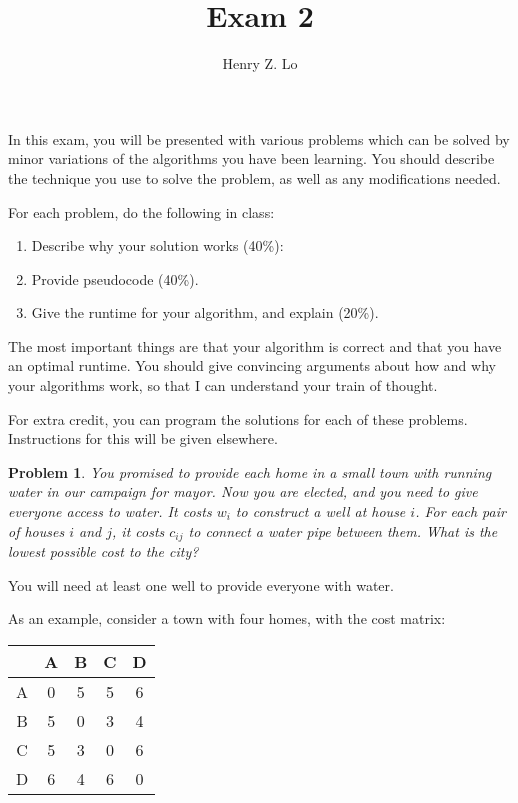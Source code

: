 \documentclass{article}
\newtheorem{problem}{Problem}
\begin{document}
\title{Exam 2}
\author{Henry Z. Lo}
\maketitle

In this exam, you will be presented with various problems which can be solved by minor variations of the algorithms you have been learning.  You should describe the technique you use to solve the problem, as well as any modifications needed.  

For each problem, do the following in class:

\begin{enumerate}
\item Describe why your solution works (40\%):
\item Provide pseudocode (40\%).
\item Give the runtime for your algorithm, and explain (20\%).
\end{enumerate}

The most important things are that your algorithm is correct and that you have an optimal runtime.  You should give convincing arguments about how and why your algorithms work, so that I can understand your train of thought.

For extra credit, you can program the solutions for each of these problems.  Instructions for this will be given elsewhere.

\pagebreak

\begin{problem}
You promised to provide each home in a small town with running water in our campaign for mayor.  Now you are elected, and you need to give everyone access to water.  It costs $w_i$ to construct a well at house $i$.  For each pair of houses $i$ and $j$, it costs $c_{ij}$ to connect a water pipe between them.  What is the lowest possible cost to the city?
\end{problem}

You will need at least one well to provide everyone with water.

As an example, consider a town with four homes, with the cost matrix:
\begin{center}
\begin{tabular}{|c|cccc|}
\hline
  & A & B & C & D \\
\hline
A & 0 & 5 & 5 & 6 \\
B & 5 & 0 & 3 & 4 \\
C & 5 & 3 & 0 & 6 \\
D & 6 & 4 & 6 & 0 \\
\hline
\end{tabular}
\end{center}
\end{document}
